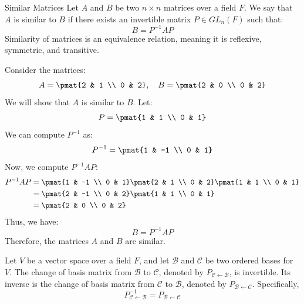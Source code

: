 \documentclass[openany]{book}
\begin{document}
\begin{mydefinition}{Similar Matrices}
    Let $A$ and $B$ be two $n \times n$ matrices over a field $F$. We say that $A$ is similar to $B$ if there exists an invertible matrix $P \in GL_n(F)$ such that:
    $$B = P^{-1}AP$$
    Similarity of matrices is an equivalence relation, meaning it is reflexive, symmetric, and transitive.
\end{mydefinition}
\begin{example}
    Consider the matrices:
    $$A = \pmat{2 & 1 \\ 0 & 2}, \quad B = \pmat{2 & 0 \\ 0 & 2}$$
    We will show that $A$ is similar to $B$. Let:
    $$P = \pmat{1 & 1 \\ 0 & 1}$$
    We can compute $P^{-1}$ as:
    $$P^{-1} = \pmat{1 & -1 \\ 0 & 1}$$
    Now, we compute $P^{-1}AP$:
    \[
    \begin{aligned}
    P^{-1}AP &= \pmat{1 & -1 \\ 0 & 1} \pmat{2 & 1 \\ 0 & 2} \pmat{1 & 1 \\ 0 & 1} \\
    &= \pmat{2 & -1 \\ 0 & 2} \pmat{1 & 1 \\ 0 & 1} \\
    &= \pmat{2 & 0 \\ 0 & 2}
    \end{aligned}
    \]
    Thus, we have:
    $$B = P^{-1}AP$$
    Therefore, the matrices $A$ and $B$ are similar.
\end{example}
\begin{mytheorem}
    Let $V$ be a vector space over a field $F$, and let $\mathcal{B}$ and $\mathcal{C}$ be two ordered bases for $V$. The change of basis matrix from $\mathcal{B}$ to $\mathcal{C}$, denoted by $P_{\mathcal{C} \leftarrow \mathcal{B}}$, is invertible. Its inverse is the change of basis matrix from $\mathcal{C}$ to $\mathcal{B}$, denoted by $P_{\mathcal{B} \leftarrow \mathcal{C}}$. Specifically,
    $$P_{\mathcal{C} \leftarrow \mathcal{B}}^{-1} = P_{\mathcal{B} \leftarrow \mathcal{C}}$$
\end{mytheorem}
\end{document}
